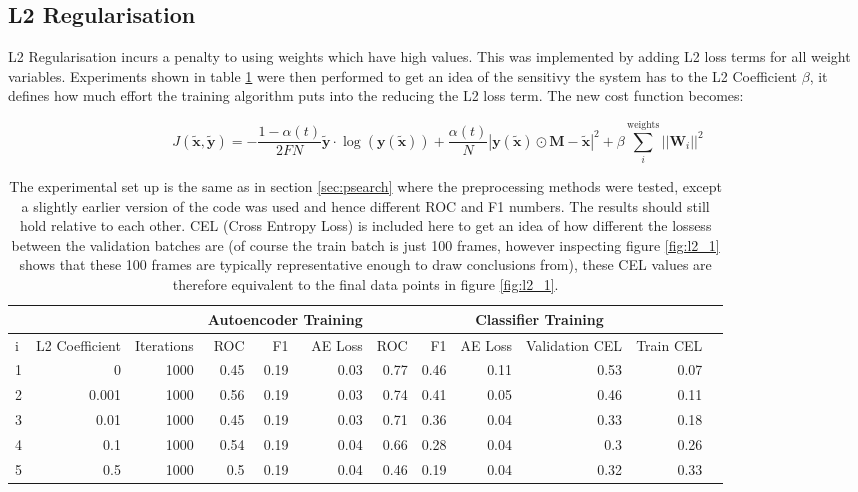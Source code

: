       \newpage
    \subsection{L2 Regularisation}
      L2 Regularisation incurs a penalty to using weights which have high values. This was implemented by adding L2
      loss terms for all weight variables. Experiments shown in table
      \ref{tab:l2_1} were then performed to get an idea of the sensitivy the system has to
      the L2 Coefficient $\beta$, it defines how much effort the training algorithm
      puts into the reducing the L2 loss term. The new cost function becomes:

      \begin{equation}
          J(\tilde{\mathbf{x}},\tilde{\mathbf{y}}) = -\frac{1-\alpha(t)}{2FN}\tilde{\mathbf{y}}\cdot\log(\mathbf{y}(\tilde{\mathbf{x}}))
          + \frac{\alpha(t)}{N}\left |\mathbf{y}(\tilde{\mathbf{x}}) \odot \mathbf{M}-\tilde{\mathbf{x}}\right | ^2
          + \beta \sum_i^{\text{weights}}||\mathbf{W}_i||^2
      \end{equation}

      \begin{table}[!h] {\small \centering
      \begin{tabular}{lrrrrrrrrrrr}
        &&&   \multicolumn{3}{|c|}{Autoencoder Training} &  \multicolumn{5}{c|}{Classifier Training}  \\
      \hline
       i &   L2 Coefficient &   Iterations &   ROC&F1&AE Loss & ROC & F1 & AE Loss &   Validation CEL &   Train CEL \\
      \hline
       1 &     0     & 1000 &    0.45 &   0.19 &     0.03 &    0.77 &   0.46 &     0.11 &  0.53 &  0.07 \\
       2 &     0.001 & 1000 &    0.56 &   0.19 &     0.03 &    0.74 &   0.41 &     0.05 &  0.46 &  0.11 \\
       3 &     0.01  & 1000 &    0.45 &   0.19 &     0.03 &    0.71 &   0.36 &     0.04 &  0.33 &  0.18 \\
       4 &     0.1   & 1000 &    0.54 &   0.19 &     0.04 &    0.66 &   0.28 &     0.04 &  0.3  &  0.26 \\
       5 &     0.5   & 1000 &    0.5  &   0.19 &     0.04 &    0.46 &   0.19 &     0.04 &  0.32 &  0.33 \\
      \hline
    \end{tabular}
    \caption{The experimental set up is the same as in section \ref{sec:psearch} where the preprocessing methods
    were tested, except a slightly earlier version
    of the code was used and hence different ROC and F1 numbers.
    The results should still hold relative to each other.
    CEL (Cross Entropy Loss) is included here to get an idea of how different
    the lossess between the validation batches are (of course the
    train batch is just 100 frames, however inspecting figure \ref{fig:l2_1} shows that
    these 100 frames are typically representative enough to draw conclusions from), these
    CEL values are therefore equivalent to the final data points in figure \ref{fig:l2_1}. } \label{tab:l2_1}
    }
    \end{table}




